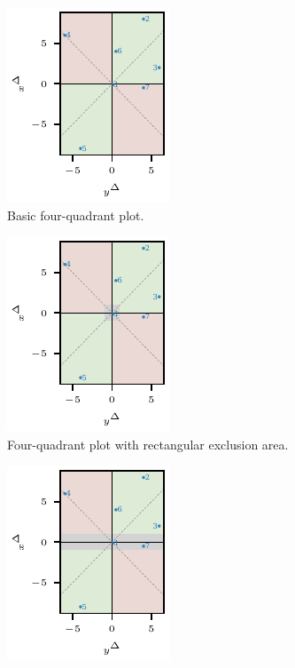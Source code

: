 \documentclass[pdflatex]{sn-jnl}
\theoremstyle{plain}%
\theoremstyle{definition}
\begin{document}
\begin{figure}
\centering
\begin{subfigure}[t]{.24\textwidth}
\includegraphics{plots/illustrative_examples/4Q_without_excl}
\caption{Basic four-quadrant plot.} \label{fig:trending_basic_4q}
\end{subfigure}\hspace{0.01\textwidth}%
\begin{subfigure}[t]{.24\textwidth}
\includegraphics{plots/illustrative_examples/4q_excl_box}
\caption{Four-quadrant plot with rectangular exclusion area.}\label{fig:trending_basic_4q_excl_box}
\end{subfigure}\hspace{0.01\textwidth}%
\begin{subfigure}[t]{.24\textwidth}
\includegraphics{plots/illustrative_examples/4q_excl_axis}

\end{subfigure}
\end{figure}
\end{document}
